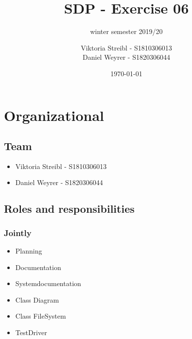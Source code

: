 
\graphicspath{{./}}



\title{SDP - Exercise 06} %
\subtitle{winter semester 2019/20} %
\author{
Viktoria Streibl - S1810306013\\
  Daniel Weyrer - S1820306044
} %
\date{\today} %

\maketitle %

\newpage
\tableofcontents %
\newpage


\section{Organizational}
\subsection{Team}
\begin{itemize}
	\item Viktoria 	Streibl 		- 	S1810306013
	\item Daniel 	Weyrer		-	S1820306044
\end{itemize}

\subsection{Roles and responsibilities}
\subsubsection{Jointly}
\begin{itemize}
	\item Planning
	\item Documentation
	\item Systemdocumentation
	\item Class Diagram
	\item Class FileSystem
	\item TestDriver
\end{itemize}

